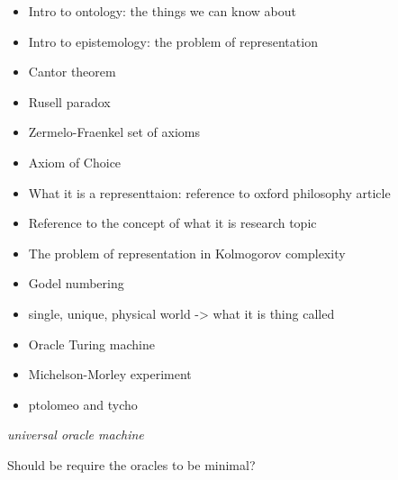 \begin{itemize}
\item Intro to ontology: the things we can know about
\item Intro to epistemology: the problem of representation
\item Cantor theorem
\item Rusell paradox
\item Zermelo-Fraenkel set of axioms
\item Axiom of Choice
\item What it is a representtaion: reference to oxford philosophy article
\item Reference to the concept of what it is research topic
\item The problem of representation in Kolmogorov complexity
\item Godel numbering
\item single, unique, physical world -> what it is thing called
\item Oracle Turing machine
\item Michelson-Morley experiment


\item ptolomeo and tycho
\end{itemize}

\emph{universal oracle machine}

Should be require the oracles to be minimal?









